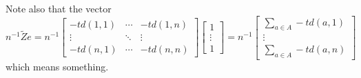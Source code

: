 \documentclass[11pt]{article}
\theoremstyle{definition}
\theoremstyle{definition}
\theoremstyle{plain}
\theoremstyle{plain}
\theoremstyle{plain}
\theoremstyle{definition}
\begin{document}
Note also that the vector
\begin{equation*}
n^{-1}\tilde{Z}e = n^{-1}\begin{bmatrix}
-td(1,1) & \cdots & -td(1,n) \\
\vdots & \ddots & \vdots \\
-td(n,1) & \cdots & -td(n,n)
\end{bmatrix}\begin{bmatrix}
1 \\ \vdots \\ 1
\end{bmatrix} = n^{-1}\begin{bmatrix}
\sum_{a \in A} -td(a,1) \\ \vdots \\ \sum_{a \in A} -td(a,n)
\end{bmatrix}
\end{equation*}
which means something.

\nocite{*}


\end{document}
